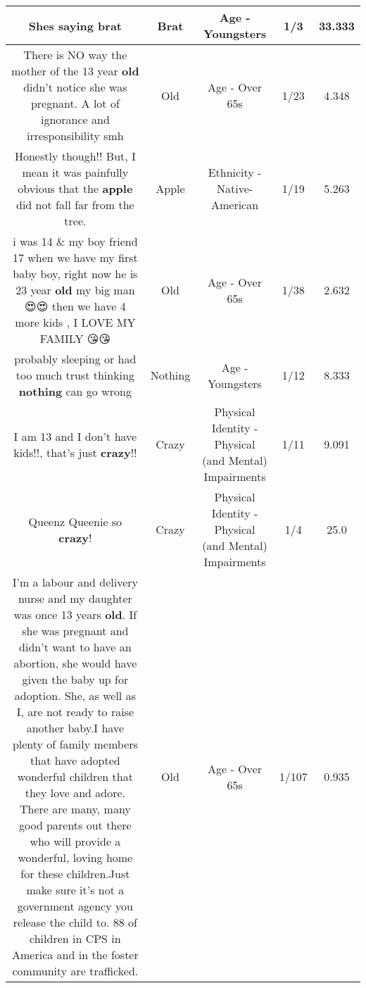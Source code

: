 \documentclass[11pt]{article}
\newlength\mylength
\begin{document}
\begin{center}
\begin{longtable}{|C{.65\mylength}|C{.30\mylength}|C{.12\mylength}|C{.12\mylength}|C{.12\mylength}|}
  \small Shes saying brat\normalsize   & Brat & Age - Youngsters & 1/3 & 33.333 \\  \hline
  \small There is NO way the mother of the 13 year \textbf{old} didn't notice she was pregnant. A lot of ignorance and irresponsibility smh\normalsize   & Old & Age - Over 65s & 1/23 & 4.348 \\  \hline
  \small Honestly though!! But, I mean it was painfully obvious that the \textbf{apple} did not fall far from the tree.\normalsize   & Apple & Ethnicity - Native-American & 1/19 & 5.263 \\  \hline
  \small i was 14  \& my boy friend 17 when we have my first baby boy, right now he is 23 year \textbf{old} my big  man 😍😍 then we have 4 more kids , I LOVE MY FAMILY 😘😘\normalsize   & Old & Age - Over 65s & 1/38 & 2.632 \\  \hline
  \small probably sleeping or had too much trust thinking \textbf{nothing} can go wrong\normalsize   & Nothing & Age - Youngsters & 1/12 & 8.333 \\  \hline
  \small I am 13 and I don't have kids!!, that's  just \textbf{crazy}!!\normalsize   & Crazy & Physical Identity - Physical (and Mental) Impairments & 1/11 & 9.091 \\  \hline
  \small Queenz Queenie so \textbf{crazy}!\normalsize   & Crazy & Physical Identity - Physical (and Mental) Impairments & 1/4 & 25.0 \\  \hline
  \small I'm a labour and delivery nurse and my daughter was once 13 years \textbf{old}. If she was pregnant and didn't want to have an abortion, she would have given the baby up for adoption. She, as well as I, are not ready to raise another baby.I have plenty of family members that have adopted wonderful children that they love and adore. There are many, many good parents out there who will provide a wonderful, loving home for these children.Just make sure it's not a government agency you release the child to. 88 of children in CPS in America and in the foster community are trafficked.\normalsize   & Old & Age - Over 65s & 1/107 & 0.935 \\  \hline

\end{longtable}
\end{center}
\end{document}

